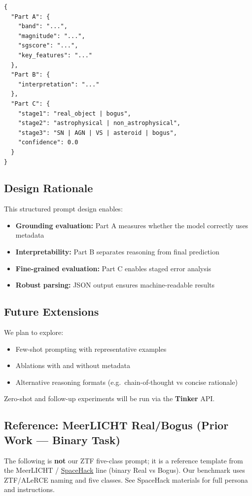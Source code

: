 \documentclass[11pt,a4paper]{article}
\begin{document}
\begin{verbatim}
{
  "Part A": {
    "band": "...",
    "magnitude": "...",
    "sgscore": "...",
    "key_features": "..."
  },
  "Part B": {
    "interpretation": "..."
  },
  "Part C": {
    "stage1": "real_object | bogus",
    "stage2": "astrophysical | non_astrophysical",
    "stage3": "SN | AGN | VS | asteroid | bogus",
    "confidence": 0.0
  }
}
\end{verbatim}

\subsection{Design Rationale}

This structured prompt design enables:
\begin{itemize}[leftmargin=*]
  \item \textbf{Grounding evaluation:} Part A measures whether the model correctly uses metadata
  \item \textbf{Interpretability:} Part B separates reasoning from final prediction
  \item \textbf{Fine-grained evaluation:} Part C enables staged error analysis
  \item \textbf{Robust parsing:} JSON output ensures machine-readable results
\end{itemize}

\subsection{Future Extensions}

We plan to explore:
\begin{itemize}[leftmargin=*]
  \item Few-shot prompting with representative examples
  \item Ablations with and without metadata
  \item Alternative reasoning formats (e.g.\ chain-of-thought vs concise rationale)
\end{itemize}

\noindent Zero-shot and follow-up experiments will be run via the \textbf{Tinker} API.

\subsection{Reference: MeerLICHT Real/Bogus (Prior Work --- Binary Task)}

The following is \textbf{not} our ZTF five-class prompt; it is a reference template from the MeerLICHT / \href{https://github.com/turanbulmus/spacehack}{SpaceHack} line (binary Real vs Bogus). Our benchmark uses ZTF/ALeRCE naming and five classes. See SpaceHack materials for full persona and instructions.
\end{document}
